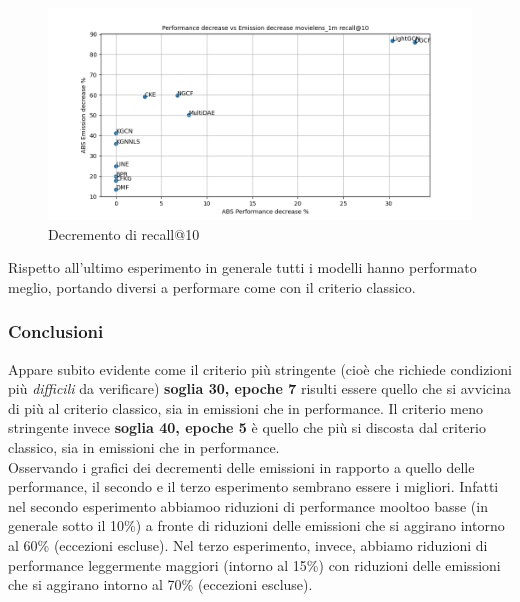 \begin{figure}[H]
    \centering
    \includegraphics[scale=0.5]{images/decrement_recall@10_movielens_1m_30_7.png}
    \caption{Decremento di recall@10}
\end{figure}

\noindent Rispetto all'ultimo esperimento in generale tutti i modelli hanno performato meglio, portando diversi a performare come con il criterio classico.



\subsubsection{Conclusioni}

Appare subito evidente come il criterio più stringente (cioè che richiede condizioni più \textit{difficili} da verificare) \textbf{soglia 30, epoche 7} risulti essere quello che si avvicina di più al criterio classico, sia in emissioni che in performance. Il criterio meno stringente invece \textbf{soglia 40, epoche 5} è quello che più si discosta dal criterio classico, sia in emissioni che in performance.\\

\noindent Osservando i grafici dei decrementi delle emissioni in rapporto a quello delle performance, il secondo e il terzo esperimento sembrano essere i migliori.
Infatti nel secondo esperimento abbiamoo riduzioni di performance mooltoo basse (in generale sotto il 10\%) a fronte di riduzioni delle emissioni che si aggirano intorno al 60\% (eccezioni escluse).
Nel terzo esperimento, invece, abbiamo riduzioni di performance leggermente maggiori (intorno al 15\%) con riduzioni delle emissioni che si aggirano intorno al 70\% (eccezioni escluse).\\
